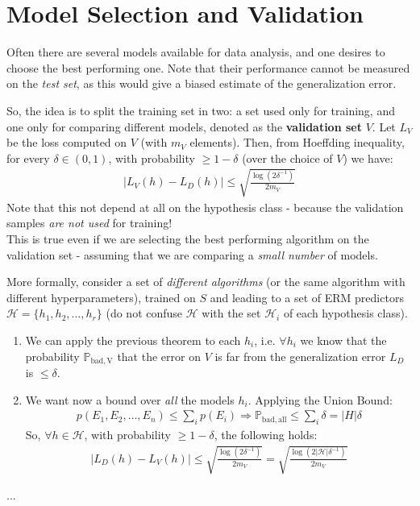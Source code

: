 \documentclass[../template.tex]{subfiles}
\begin{document}
\section{Model Selection and Validation}
Often there are several models available for data analysis, and one desires to choose the best performing one. Note that their performance cannot be measured on the \textit{test set}, as this would give a biased estimate of the generalization error.

So, the idea is to split the training set in two: a set used only for training, and one only for comparing different models, denoted as the \textbf{validation set} $V$. Let $L_V$ be the loss computed on $V$ (with $m_V$ elements). Then, from Hoeffding inequality, for every $\delta \in (0,1)$, with probability $\geq 1- \delta$ (over the choice of $V$) we have:
\begin{align*}
    |L_V(h) - L_D(h)| \leq \sqrt{\frac{\log(2 \delta^{-1})}{2 m_V} }
\end{align*}        
Note that this not depend at all on the hypothesis class - because the validation samples \textit{are not used} for training!\\

This is true even if we are selecting the best performing algorithm on the validation set - assuming that we are comparing a \textit{small number} of models.

More formally, consider a set of \textit{different algorithms} (or the same algorithm with  different hyperparameters), trained on $S$ and leading to a set of ERM predictors $\mathcal{H}=\{h_1,h_2, \dots, h_r\}$ (do not confuse $\mathcal{H}$ with the set $\mathcal{H}_i$ of each hypothesis class).
\begin{enumerate}
    \item We can apply the previous theorem to each $h_i$, i.e. $\forall h_i$ we know that the probability $\mathbb{P}_{\mathrm{bad,V}}$ that the error on $V$ is far from the generalization error $L_D$ is $\leq \delta$.
    \item We want now a bound over \textit{all} the models $h_i$. Applying the Union Bound:
    \begin{align*}
        p(E_1,E_2,\dots, E_n) \leq\sum_i p(E_i) \Rightarrow \mathbb{P}_{\mathrm{bad, all} }  \leq \sum_i \delta   = |H| \delta
    \end{align*}        
    So, $\forall h \in \mathcal{H}$, with probability $\geq 1- \delta$, the following holds:
    \begin{align*}
        |L_D(h) - L_V(h)| \leq \sqrt{\frac{\log(2 \delta^{-1})}{2 m_V} } = \sqrt{\frac{\log(2|\mathcal{H}|\delta^{-1})}{2m_V} }
    \end{align*}  
\end{enumerate}
    
...
\end{document}
